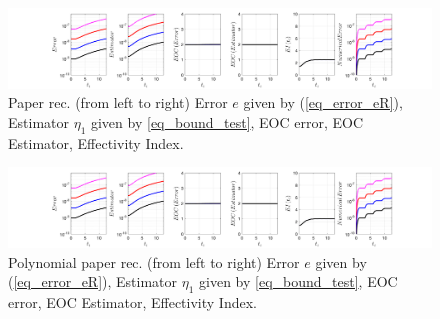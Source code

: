 \documentclass[12pt,a4paper]{article}
\numberwithin{equation}{section}
\theoremstyle{definition}
\begin{document}
\begin{figure}[H]
	\hspace{-3cm}
	\includegraphics[scale=0.55]{fig_LeapFrogplots_1x5_sin_IC_harmonic_u2_v8_paperrec}	
	\caption{Paper rec. (from left to right) Error $e$ given by (\ref{eq_error_eR}), Estimator $\eta_1$ given by \ref{eq_bound_test},   EOC error, EOC Estimator, Effectivity Index.}
	\label{fig_all_in_one_paperrec_u02_v08}
\end{figure}
\begin{figure}[H]
	\hspace{-3cm}
	\includegraphics[scale=0.55]{fig_LeapFrogplots_1x5_sin_IC_harmonic_u2_v8_paperrec_poly}	
	\caption{Polynomial paper rec. (from left to right) Error $e$ given by (\ref{eq_error_eR}), Estimator $\eta_1$ given by \ref{eq_bound_test},   EOC error, EOC Estimator, Effectivity Index.}
	\label{fig_all_in_one_paperrec_poly_u02_v08}
\end{figure}
\end{document}
